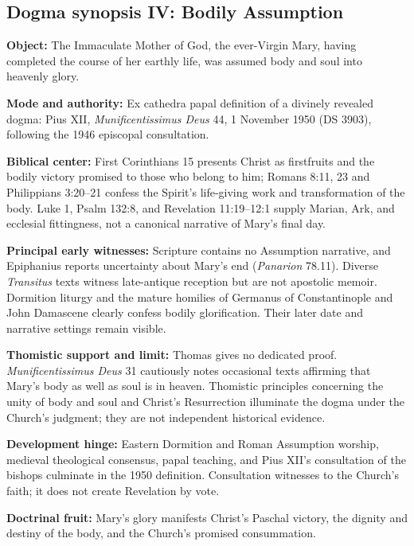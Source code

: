 \clearpage
\subsection*{Dogma synopsis IV: Bodily Assumption}

\begingroup
\small
\begin{studyframe}
\textbf{Object:} The Immaculate Mother of God, the ever-Virgin Mary, having
completed the course of her earthly life, was assumed body and soul into
heavenly glory.\par
\textbf{Mode and authority:} Ex cathedra papal definition of a divinely
revealed dogma: Pius XII, \emph{Munificentissimus Deus} 44, 1 November 1950
(DS 3903), following the 1946 episcopal consultation.\par
\textbf{Biblical center:} First Corinthians 15 presents Christ as firstfruits
and the bodily victory promised to those who belong to him; Romans 8:11, 23 and
Philippians 3:20--21 confess the Spirit's life-giving work and transformation
of the body.  Luke 1, Psalm 132:8, and Revelation 11:19--12:1 supply Marian,
Ark, and ecclesial fittingness, not a canonical narrative of Mary's final day.\par
\textbf{Principal early witnesses:} Scripture contains no Assumption
narrative, and Epiphanius reports uncertainty about Mary's end
(\emph{Panarion} 78.11).  Diverse \emph{Transitus} texts witness late-antique
reception but are not apostolic memoir.  Dormition liturgy and the mature
homilies of Germanus of Constantinople and John Damascene clearly confess
bodily glorification.  Their later date and narrative settings remain visible.\par
\textbf{Thomistic support and limit:} Thomas gives no dedicated proof.
\emph{Munificentissimus Deus} 31 cautiously notes occasional texts affirming
that Mary's body as well as soul is in heaven.  Thomistic principles concerning
the unity of body and soul and Christ's Resurrection illuminate the dogma under
the Church's judgment; they are not independent historical evidence.\par
\textbf{Development hinge:} Eastern Dormition and Roman Assumption worship,
medieval theological consensus, papal teaching, and Pius XII's consultation of
the bishops culminate in the 1950 definition.  Consultation witnesses to the
Church's faith; it does not create Revelation by vote.\par
\textbf{Doctrinal fruit:} Mary's glory manifests Christ's Paschal victory,
the dignity and destiny of the body, and the Church's promised consummation.

\end{studyframe}
